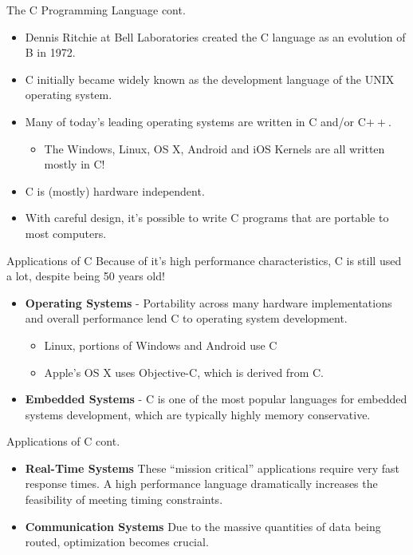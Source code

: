 \documentclass[11pt]{beamer}
\begin{document}
\begin{frame}{The C Programming Language cont.}
\begin{itemize}
\item Dennis Ritchie at Bell Laboratories created the C language as an evolution of B in 1972.
\item C initially became widely known as the development language of the UNIX operating system.
\item Many of today's leading operating systems are written in C and/or C$++$. 
\begin{itemize}
\item The Windows, Linux, OS X, Android and iOS Kernels are all written mostly in C!
\end{itemize}
\item C is (mostly) hardware independent.
\item With careful design, it’s possible to write C programs that are portable to most computers. 
\end{itemize}
\end{frame}

\begin{frame}{Applications of C}
Because of it's high performance characteristics, C is still used a lot, despite being 50 years old! 
\begin{itemize}
\item \textbf{Operating Systems} - Portability across many hardware implementations and overall performance lend C to operating system development.  
\begin{itemize}
\item Linux, portions of Windows and Android use C
\item Apple's OS X uses Objective-C, which is derived from C.
\end{itemize} 
\item \textbf{Embedded Systems} - C is one of the most popular languages for embedded systems development, which are typically highly memory conservative.  
\end{itemize}
\end{frame}

\begin{frame}{Applications of C cont.}
\begin{itemize}
\item \textbf{Real-Time Systems} These ``mission critical'' applications require very fast response times.  A high performance language dramatically increases the feasibility of meeting timing constraints.
\item \textbf{Communication Systems} Due to the massive quantities of data being routed, optimization becomes crucial.  
\end{itemize}
\end{frame}
\end{document}
